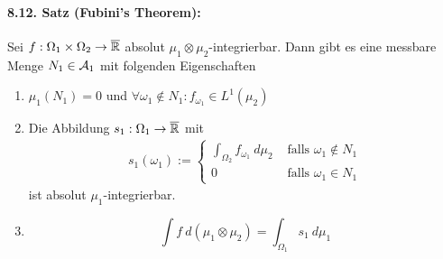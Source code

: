 \paragraph{8.12. Satz (Fubini's Theorem):}Sei $f:\Omega_1\times\Omega_2\to\overline{\mathbb{R}}$ absolut $\mu_1\otimes\mu_2$-integrierbar. Dann gibt es eine messbare Menge $N_1\in\mathcal{A}_1$ mit folgenden Eigenschaften
\begin{enumerate}[label=(\roman*)]
    \item $\mu_1(N_1)=0$ und $\forall\omega_1\notin N_1:f_{\omega_1}\in L^1(\mu_2)$
    \item Die Abbildung $s_1:\Omega_1\to\overline{\mathbb{R}}$ mit
    \begin{align*}
        s_1(\omega_1):=
    \begin{cases}
       \displaystyle \int_{\Omega_2} f_{\omega_1}\ d\mu_2&\text{ falls }\omega_1\notin N_1 \\
       0&\text{ falls }\omega_1\in N_1
    \end{cases}
    \end{align*}
    ist absolut $\mu_1$-integrierbar.
    \item $$\int f\ d(\mu_1\otimes\mu_2)=\int_{\Omega_1}s_1\ d\mu_1$$
\end{enumerate}

